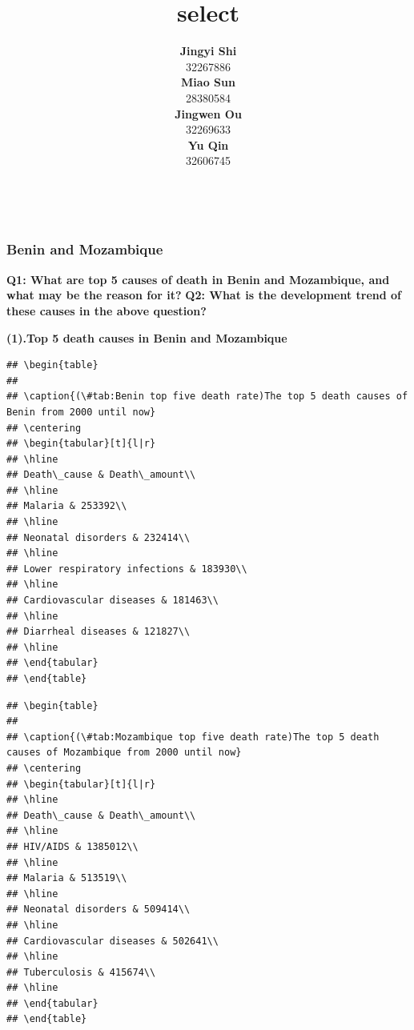 \documentclass[11pt,a4paper,]{article}
\title{select}
\author{\sf\Large\textbf{ Jingyi Shi}\\ {\sf\large 32267886\\[0.5cm]} \sf\Large\textbf{ Miao Sun}\\ {\sf\large 28380584\\[0.5cm]} \sf\Large\textbf{ Jingwen Ou}\\ {\sf\large 32269633\\[0.5cm]} \sf\Large\textbf{ Yu Qin}\\ {\sf\large 32606745\\[0.5cm]}}
\date{\sf\Date~\Month~\Year}
\makeatletter
\def\titlepage{\front{\expandafter{\@title}}{\@author}{\@organization}}
\makeatother
\begin{document}
\titlepage

\hypertarget{benin-and-mozambique}{%
\subsubsection{Benin and Mozambique}\label{benin-and-mozambique}}

\textbf{Q1: What are top 5 causes of death in Benin and Mozambique, and what may be the reason for it?}
\textbf{Q2: What is the development trend of these causes in the above question?}

\textbf{(1).Top 5 death causes in Benin and Mozambique}

\begin{verbatim}
## \begin{table}
## 
## \caption{(\#tab:Benin top five death rate)The top 5 death causes of Benin from 2000 until now}
## \centering
## \begin{tabular}[t]{l|r}
## \hline
## Death\_cause & Death\_amount\\
## \hline
## Malaria & 253392\\
## \hline
## Neonatal disorders & 232414\\
## \hline
## Lower respiratory infections & 183930\\
## \hline
## Cardiovascular diseases & 181463\\
## \hline
## Diarrheal diseases & 121827\\
## \hline
## \end{tabular}
## \end{table}
\end{verbatim}

\begin{verbatim}
## \begin{table}
## 
## \caption{(\#tab:Mozambique top five death rate)The top 5 death causes of Mozambique from 2000 until now}
## \centering
## \begin{tabular}[t]{l|r}
## \hline
## Death\_cause & Death\_amount\\
## \hline
## HIV/AIDS & 1385012\\
## \hline
## Malaria & 513519\\
## \hline
## Neonatal disorders & 509414\\
## \hline
## Cardiovascular diseases & 502641\\
## \hline
## Tuberculosis & 415674\\
## \hline
## \end{tabular}
## \end{table}
\end{verbatim}
\end{document}
